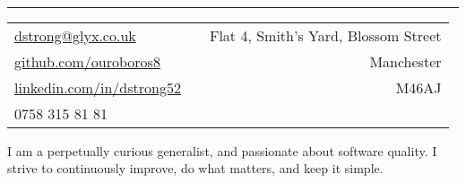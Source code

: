 \documentclass[a4paper,10pt]{article} %
\begin{document}
\pagestyle{empty} %


\\ %
\hrule
\footnotesize
{\begin{tabularx}{\textwidth}{lXr}
\href{mailto:dstrong@glyx.co.uk}{dstrong@glyx.co.uk}                    & & {Flat 4, Smith's Yard, Blossom Street}\\
\href{https://github.com/ouroboros8}{github.com/ouroboros8}             & & {Manchester}\\
\href{https://www.linkedin.com/in/dstrong52}{linkedin.com/in/dstrong52} & & {M46AJ} \\
{0758 315 81 81}                                                        & &
\end{tabularx}}

\begin{flushleft}
I am a perpetually curious generalist, and passionate about software quality.
I strive to continuously improve, do what matters, and keep it simple.
\end{flushleft}

\end{document}
